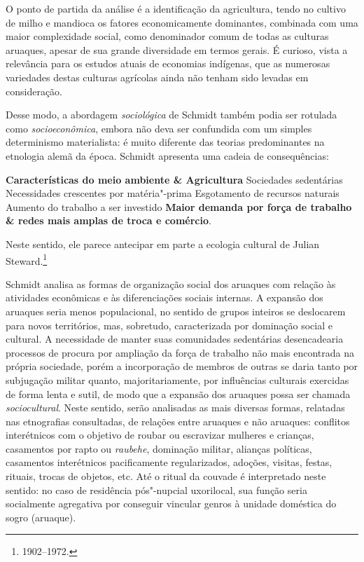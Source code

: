 O ponto de partida da análise é a identificação da agricultura, tendo no cultivo de milho e mandioca os fatores economicamente dominantes, combinada com uma maior complexidade social, como denominador comum de todas as culturas aruaques, apesar de sua grande diversidade em termos gerais. É curioso, vista a relevância para os estudos atuais de economias indígenas, que as numerosas variedades destas culturas agrícolas ainda não tenham sido levadas em consideração.

Desse modo, a abordagem \textit{sociológica} de Schmidt também podia ser
rotulada como \textit{socioeconômica}, embora não deva ser confundida com um
simples determinismo materialista: é muito diferente das teorias
predominantes na etnologia alemã da época. Schmidt apresenta uma cadeia
de consequências: 
\medskip

\textbf{Características do meio ambiente \& Agricultura} \rightarrow{} Sociedades sedentárias \rightarrow{} Necessidades crescentes por matéria"-prima \rightarrow{} Esgotamento de recursos naturais \rightarrow{} Aumento do trabalho a ser investido \rightarrow{} \textbf{Maior demanda por força de trabalho \& redes mais amplas
de troca e comércio}.

\medskip
Neste sentido, ele parece antecipar em parte a
ecologia cultural de Julian Steward.\footnote{1902--1972.}

Schmidt analisa as formas de organização social dos aruaques com relação às atividades econômicas e às diferenciações sociais internas. A expansão dos aruaques seria menos populacional, no sentido de grupos inteiros se deslocarem para novos territórios, mas, sobretudo, caracterizada por dominação social e cultural. A necessidade de manter suas comunidades sedentárias desencadearia processos de procura por ampliação da força de trabalho não mais encontrada na própria sociedade, porém a incorporação de membros de outras se daria tanto por subjugação militar quanto, majoritariamente, por influências culturais exercidas de forma lenta e sutil, de modo que a expansão dos aruaques possa ser chamada \textit{sociocultural}. Neste sentido, serão analisadas as mais diversas formas, relatadas nas etnografias consultadas, de relações entre aruaques e não aruaques: conflitos interétnicos com o objetivo de roubar ou escravizar mulheres e crianças, casamentos por rapto ou \textit{raubehe}, dominação militar, alianças políticas, casamentos interétnicos pacificamente regularizados, adoções, visitas, festas, rituais, trocas de objetos, etc. Até o ritual da couvade é interpretado neste sentido: no caso de residência pós"-nupcial uxorilocal, sua função seria socialmente agregativa por conseguir vincular genros à unidade doméstica do sogro (aruaque).

